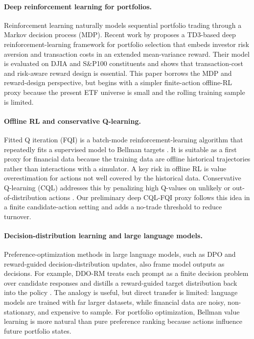 \documentclass[11pt]{article}
\begin{document}
\paragraph{Deep reinforcement learning for portfolios.}
Reinforcement learning naturally models sequential portfolio trading through a Markov decision process (MDP). Recent work by \citet{JiangOlmoAtwi2024} proposes a TD3-based deep reinforcement-learning framework for portfolio selection that embeds investor risk aversion and transaction costs in an extended mean-variance reward. Their model is evaluated on DJIA and S\&P100 constituents and shows that transaction-cost and risk-aware reward design is essential. This paper borrows the MDP and reward-design perspective, but begins with a simpler finite-action offline-RL proxy because the present ETF universe is small and the rolling training sample is limited.

\paragraph{Offline RL and conservative Q-learning.}
Fitted Q iteration (FQI) is a batch-mode reinforcement-learning algorithm that repeatedly fits a supervised model to Bellman targets \citep{ErnstGeurtsWehenkel2005}. It is suitable as a first proxy for financial data because the training data are offline historical trajectories rather than interactions with a simulator. A key risk in offline RL is value overestimation for actions not well covered by the historical data. Conservative Q-learning (CQL) addresses this by penalizing high Q-values on unlikely or out-of-distribution actions \citep{Kumar2020CQL}. Our preliminary deep CQL-FQI proxy follows this idea in a finite candidate-action setting and adds a no-trade threshold to reduce turnover.

\paragraph{Decision-distribution learning and large language models.}
Preference-optimization methods in large language models, such as DPO and reward-guided decision-distribution updates, also frame model outputs as decisions. For example, DDO-RM treats each prompt as a finite decision problem over candidate responses and distills a reward-guided target distribution back into the policy \citep{ZhangZuoWang2026DDORM}. The analogy is useful, but direct transfer is limited: language models are trained with far larger datasets, while financial data are noisy, non-stationary, and expensive to sample. For portfolio optimization, Bellman value learning is more natural than pure preference ranking because actions influence future portfolio states.
\end{document}
